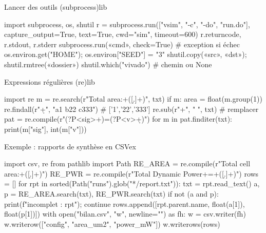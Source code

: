 \documentclass{article}
\begin{document}
\begin{colonne}[outils][col-b]
\begin{bloc}{Lancer des outils (subprocess)}{lib}
\begin{code}
import subprocess, os, shutil
r = subprocess.run(["vsim", "-c", "-do", "run.do"],
                   capture_output=True, text=True,
                   cwd="sim", timeout=600)
r.returncode, r.stdout, r.stderr
subprocess.run(«cmd», check=True)  # exception si échec
os.environ.get("HOME"); os.environ["SEED"] = "3"
shutil.copy(«src», «dst»); shutil.rmtree(«dossier»)
shutil.which("vivado")           # chemin ou None
\end{code}
\end{bloc}

\begin{bloc}{Expressions régulières (re)}{lib}
\begin{code}
import re
m = re.search(r"Total area:\s+([\d.]+)", txt)
if m: area = float(m.group(1))
re.findall(r"\d+", "a1 b22 c333")  # ['1','22','333']
re.sub(r"\s+", " ", txt)           # remplacer
pat = re.compile(r"(?P<sig>\w+)\s*=\s*(?P<v>\d+)")
for m in pat.finditer(txt):
    print(m["sig"], int(m["v"]))
\end{code}
\end{bloc}

\begin{bloc}{Exemple : rapports de synthèse en CSV}{ex}
\begin{code}
import csv, re
from pathlib import Path
RE_AREA = re.compile(r"Total cell area:\s+([\d.]+)")
RE_PWR = re.compile(r"Total Dynamic Power\s+=\s+([\d.]+)")
rows = []
for rpt in sorted(Path("runs").glob("*/report.txt")):
    txt = rpt.read_text()
    a, p = RE_AREA.search(txt), RE_PWR.search(txt)
    if not (a and p):
        print(f"incomplet : {rpt}"); continue
    rows.append([rpt.parent.name, float(a[1]),
                 float(p[1])])
with open("bilan.csv", "w", newline="") as fh:
    w = csv.writer(fh)
    w.writerow(["config", "area_um2", "power_mW"])
    w.writerows(rows)
\end{code}
\end{bloc}


\end{colonne}
\end{document}
